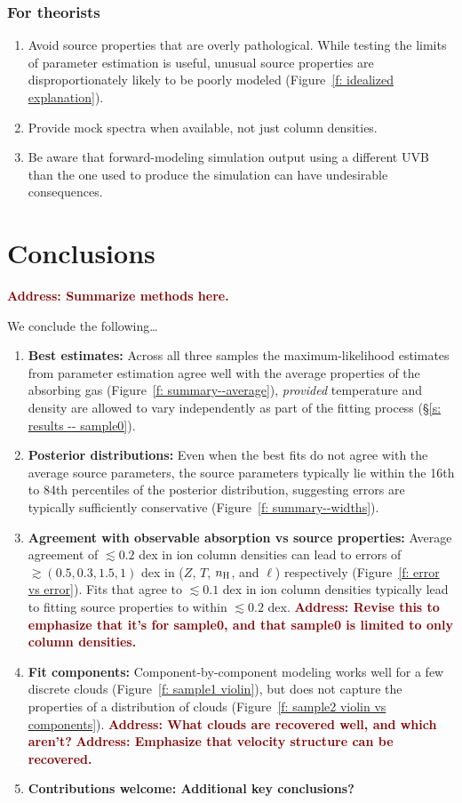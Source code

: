 \documentclass[fleqn,usenatbib]{mnras}
\newcommand{\thoughts}[1]{\textcolor{BurntOrange}{\textbf{Contributions welcome: #1}}}
\newcommand{\todo}[1]{\textcolor{Maroon}{\textbf{Address: #1}}}
\begin{document}
\subsubsection{For theorists}

\begin{enumerate}
    \item Avoid source properties that are overly pathological. While testing the limits of  parameter estimation is useful, unusual source properties are disproportionately likely to be poorly modeled (Figure~\ref{f: idealized explanation}).
    \item Provide mock spectra when available, not just column densities.
    \item Be aware that forward-modeling simulation output using a different UVB than the one used to produce the simulation can have undesirable consequences.
\end{enumerate}

\section{Conclusions}
\label{s: conclusions}

\todo{Summarize methods here.}

We conclude the following\ldots
\begin{enumerate}
    \item \textbf{Best estimates:} Across all three samples the maximum-likelihood estimates from parameter estimation agree well with the average properties of the absorbing gas (Figure~\ref{f: summary--average}), \textit{provided} temperature and density are allowed to vary independently as part of the fitting process (\S\ref{s: results -- sample0}).
    \item \textbf{Posterior distributions:} Even when the best fits do not agree with the average source parameters, the source parameters typically lie within the 16th to 84th percentiles of the posterior distribution, suggesting errors are typically sufficiently conservative (Figure~\ref{f: summary--widths}).
    \item \textbf{Agreement with observable absorption vs source properties:} Average agreement of $\lesssim 0.2$ dex in ion column densities can lead to errors of $\gtrsim (0.5, 0.3, 1.5, 1)$ dex in ($Z$, $T$, $n_{\rm H}$, and $\ell$) respectively (Figure~\ref{f: error vs error}). Fits that agree to $\lesssim 0.1$ dex in ion column densities typically lead to fitting source properties to within $\lesssim 0.2$ dex. \todo{Revise this to emphasize that it's for sample0, and that sample0 is limited to only column densities.}
    \item \textbf{Fit components:} Component-by-component modeling works well for a few discrete clouds (Figure~\ref{f: sample1 violin}), but does not capture the properties of a distribution of clouds (Figure~\ref{f: sample2 violin vs components}). \todo{What clouds are recovered well, and which aren't?}
    \todo{Emphasize that velocity structure can be recovered.}
    \item \thoughts{Additional key conclusions?}
\end{enumerate}
\end{document}

